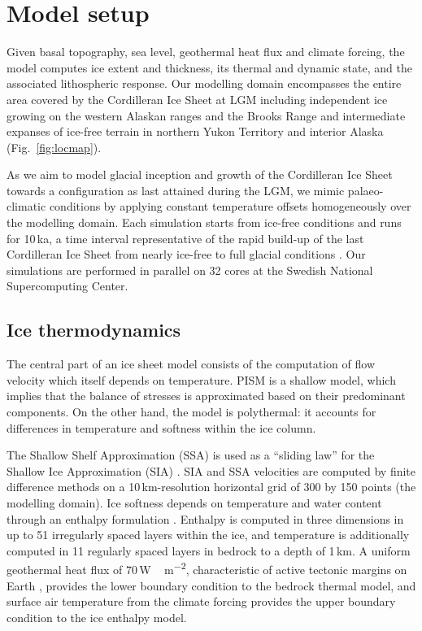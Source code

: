 \section{Model setup}
\label{sec:model}

Given basal topography, sea level, geothermal heat flux and climate forcing, the model computes ice extent and thickness, its thermal and dynamic state, and the associated lithospheric response. Our modelling domain encompasses the entire area covered by the Cordilleran Ice Sheet at LGM including independent ice growing on the western Alaskan ranges and the Brooks Range and intermediate expanses of ice-free terrain in northern Yukon Territory and interior Alaska (Fig.~\ref{fig:locmap}).

As we aim to model glacial inception and growth of the Cordilleran Ice Sheet towards a configuration as last attained during the LGM, we mimic palaeo-climatic conditions by applying constant temperature offsets homogeneously over the modelling domain. Each simulation starts from ice-free conditions and runs for 10\,ka, a time interval representative of the rapid build-up of the last Cordilleran Ice Sheet from nearly ice-free to full glacial conditions \citep{clague-1989,stroeven-etal-2010}. Our simulations are performed in parallel on 32 cores at the Swedish National Supercomputing Center.

\subsection{Ice thermodynamics}

The central part of an ice sheet model consists of the computation of flow velocity which itself depends on temperature. PISM is a shallow model, which implies that the balance of stresses is approximated based on their predominant components. On the other hand, the model is polythermal: it accounts for differences in temperature and softness within the ice column.

The Shallow Shelf Approximation (SSA) is used as a ``sliding law'' for the Shallow Ice Approximation (SIA) \citep{bueler-brown-2009,winkelmann-etal-2011}. SIA and SSA velocities are computed by finite difference methods on a 10\,km-resolution horizontal grid of 300 by 150 points (the modelling domain). Ice softness depends on temperature and water content through an enthalpy formulation \citep{aschwanden-blatter-2009,aschwanden-etal-2012}. Enthalpy is computed in three dimensions in up to 51 irregularly spaced layers within the ice, and temperature is additionally computed in 11 regularly spaced layers in bedrock to a depth of 1\,km. A uniform geothermal heat flux of 70\,\unit{W\,m^{-2}}, characteristic of active tectonic margins on Earth \citep[e.g.,][]{artemieva-mooney-2001}, provides the lower boundary condition to the bedrock thermal model, and surface air temperature from the climate forcing provides the upper boundary condition to the ice enthalpy model.


